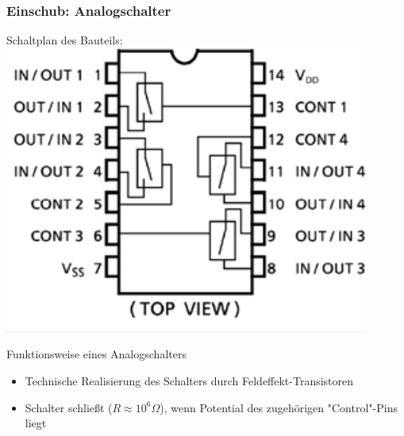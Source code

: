 \documentclass[compress,11pt]{beamer}
\begin{document}
\subsubsection{Einschub: Analogschalter}
\begin{frame}
Schaltplan des Bauteils:\\
\includegraphics[width=.7\textwidth]{schalt/analog}
\end{frame}
\begin{frame}
\begin{block}{Funktionsweise eines Analogschalters}
\begin{itemize}
\item Technische Realisierung des Schalters durch Feldeffekt-Transistoren
\item Schalter schließt ($R \approx 10^6 \Omega$), wenn Potential des zugehörigen "Control"-Pins liegt

\end{itemize}
\end{block}
\end{frame}
\end{document}
